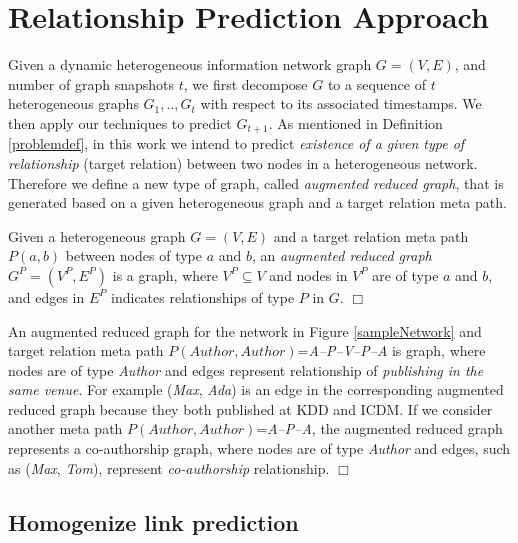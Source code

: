 \section{Relationship Prediction Approach}

Given a dynamic heterogeneous information network graph $G=(V,E)$, and number of graph snapshots $t$, we first decompose $G$ to a sequence of $t$ heterogeneous graphs ${G_1, .., G_t}$ with respect to its associated timestamps. We then apply our techniques to predict $G_{t+1}$. As mentioned in Definition \ref{problemdef}, in this work we intend to predict \textit{existence of a given type of relationship} (target relation) between two nodes in a heterogeneous network. Therefore we define a new type of graph, called \textit{augmented reduced graph}, that is generated based on a given heterogeneous graph and a target relation meta path. 

\begin{definition}\label{def:ARG}
Given a heterogeneous graph $G=(V,E)$ and a target relation meta path $P(a,b)$ between nodes of type $a$ and $b$, an \textit{augmented reduced graph} $G^P=(V^P,E^P)$ is a graph, where $V^P \subseteq V$ and nodes in $V^P$ are of type $a$ and $b$, and edges in $E^P$ indicates relationships of type $P$ in $G$. $\Box$
\end{definition}

\begin{example}
An augmented reduced graph for the network in Figure \ref{sampleNetwork} and target relation meta path $P(Author,Author)$=\textit{A--P--V--P--A} is graph, where nodes are of type \textit{Author} and edges represent relationship of \textit{publishing in the same venue}. For example (\textit{Max}, \textit{Ada}) is an edge in the corresponding augmented reduced graph because they both published at KDD and ICDM. If we consider another meta path $P(Author,Author)$=\textit{A--P--A}, the augmented reduced graph represents a co-authorship graph, where nodes are of type \textit{Author} and edges, such as (\textit{Max}, \textit{Tom}), represent \textit{co-authorship} relationship.  $\Box$

\end{example}



\subsection{Homogenize link prediction}

